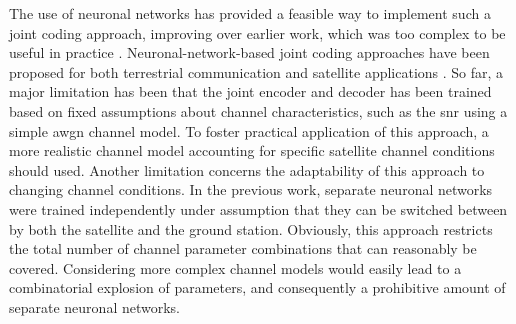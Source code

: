 \documentclass[conference]{IEEEtran}
\begin{document}
The use of neuronal networks has provided a feasible way to implement such a joint coding approach, improving over earlier work, which was too complex to be useful in practice \cite{9838671}.
Neuronal-network-based joint coding approaches have been proposed for both terrestrial communication \cite{Bourtsoulatze2019} and satellite applications \cite{satjscc}.
So far, a major limitation has been that the joint encoder and decoder has been trained based on fixed assumptions about channel characteristics, such as the \ac{snr} using a simple \ac{awgn} channel model. 
To foster practical application of this approach, 
a more realistic channel model accounting for specific satellite channel conditions should used.
Another limitation concerns the adaptability of this approach to changing channel conditions. In the previous work, separate neuronal networks were trained independently under assumption that they can be switched between by both the satellite and the ground station.
Obviously, this approach restricts the total number of channel parameter combinations that can reasonably be covered.
Considering more complex channel models %
would easily lead to a combinatorial explosion of parameters, and consequently a prohibitive amount of separate neuronal networks.
\end{document}

